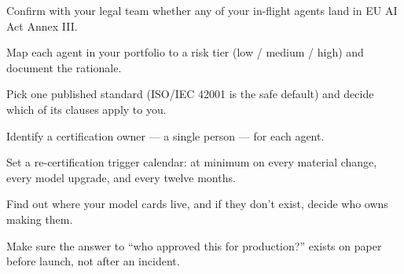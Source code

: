 \begin{TNchecklist}
\item Confirm with your legal team whether any of your in-flight agents land in EU AI Act Annex III.
\item Map each agent in your portfolio to a risk tier (low / medium / high) and document the rationale.
\item Pick one published standard (ISO/IEC 42001 is the safe default) and decide which of its clauses apply to you.
\item Identify a certification owner --- a single person --- for each agent.
\item Set a re-certification trigger calendar: at minimum on every material change, every model upgrade, and every twelve months.
\item Find out where your model cards live, and if they don't exist, decide who owns making them.
\item Make sure the answer to ``who approved this for production?'' exists on paper before launch, not after an incident.
\end{TNchecklist}



